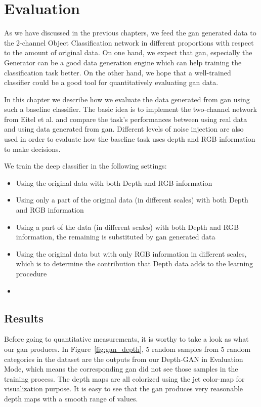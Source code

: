 
\chapter{Evaluation\label{cha:evaluation}}
As we have discussed in the previous chapters, we feed the \acrshort{gan} generated data
to the 2-channel Object Classification network in different proportions with respect to
the amount of original data. On one hand, we expect that \acrshort{gan}, especially the
Generator can be a good data generation engine which can help training the classification
task better. On the other hand, we hope that a well-trained classifier could be a good
tool for quantitatively evaluating \acrshort{gan} data.

In this chapter we describe how we evaluate the data generated from \acrshort{gan} using
such a baseline classifier. The basic idea is to implement the two-channel network from
Eitel et al. and compare the task's performances between using real data and using data
generated from \acrshort{gan}. Different levels of noise injection are also used in order
to evaluate how the baseline task uses depth and RGB information to make decisions.

We train the deep classifier in the following settings:

\begin{itemize}
	\item Using the original data with both Depth and RGB information
	\item Using only a part of the original data (in different scales) with both Depth and
		RGB information
	\item Using a part of the data (in different scales) with both Depth and RGB
		information, the remaining is substituted by \acrshort{gan} generated data
	\item Using the original data but with only RGB information in different scales, which
		is to determine the contribution that Depth data adds to the learning procedure
	\item 
\end{itemize}

\section{Results}
Before going to quantitative measurements, it is worthy to take a look as what our
\acrshort{gan} produces. In Figure~\ref{fig:gan_depth}, 5 random samples from 5 random
categories in the dataset are the outputs from our Depth-GAN in Evaluation Mode, which
means the corresponding \acrshort{gan} did not see those samples in the training process.
The depth maps are all colorized using the jet color-map for visualization purpose. It is
easy to see that the \acrshort{gan} produces very reasonable depth maps with a smooth
range of values. 

